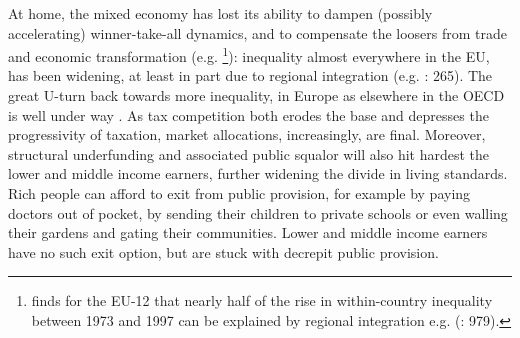 \documentclass[11pt,a4paper,oneside,openright]{article}
\begin{document}
At home, the mixed economy has lost its ability to dampen (possibly accelerating) winner-take-all dynamics, and to compensate the loosers from trade and economic transformation (e.g. \citealt{Beckfield2006}\footnote{
	\citeauthor{Beckfield2006} finds for the \gls{EU}-12 that nearly half of the rise in within-country inequality between 1973 and 1997 can be explained by regional integration e.g. (\citeyear{Beckfield2006}: 979).}): 
inequality almost everywhere in the \gls{EU}, has been widening, at least in part due to regional integration (e.g. \citealt{DaudUngl2008}: 265). The great U-turn back towards more inequality, in Europe as elsewhere in the \gls{OECD} is well under way \citep{AldersonNielsen-2002-aa}. As tax competition both erodes the base and depresses the progressivity of taxation, market allocations, increasingly, are final. Moreover, structural underfunding and associated public squalor will also hit hardest the lower and middle income earners, further widening the divide in living standards. Rich people can afford to exit from public provision, for example by paying doctors out of pocket, by sending their children to private schools or even walling their gardens and gating their communities. Lower and middle income earners have no such exit option, but are stuck with decrepit public provision.
\end{document}
